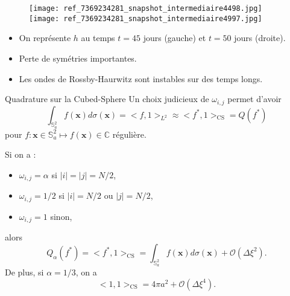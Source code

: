 \documentclass[11pt]{beamer}
\def\CS{\text{CS}}
\def\gint{\displaystyle\int}
\begin{document}
\begin{frame}{}
\begin{figure}
\texttt{[image: ref\_7369234281\_snapshot\_intermediaire4498.jpg]}
\texttt{[image: ref\_7369234281\_snapshot\_intermediaire4997.jpg]}
\end{figure}
\begin{itemize}
\item On représente $h$ au temps $t=45$ jours (gauche) et $t=50$ jours (droite).
\item Perte de symétries importantes.
\item Les ondes de Rossby-Haurwitz sont instables sur des temps longs.
\end{itemize}
\end{frame}






















\begin{frame}{Quadrature sur la Cubed-Sphere}
Un choix judicieux de $\omega_{i,j}$ permet d'avoir
$$
\gint_{\mathbb{S}_a^2} f(\mathbf{x}) d \sigma(\mathbf{x}) = <f, 1>_{L^2} \approx <f^*, \mathfrak{1}>_{\CS} = Q(f^*)
$$
pour $f : \mathbf{x} \in \mathbb{S}_a^2 \mapsto f(\mathbf{x}) \in \mathbb{C}$ régulière. 

\begin{block}{}
Si on a :
\begin{itemize}
\item $\omega_{i,j} = \alpha$ si $|i| = |j| = N/2$,
\item $\omega_{i,j} = 1/2$ si $|i| = N/2$ ou $|j| = N/2$,
\item $\omega_{i,j} = 1$ sinon,
\end{itemize}
alors
$$
 Q_{\alpha}(f^*) =  <f^*, \mathfrak{1}>_{\CS} = \gint_{\mathbb{S}_a^2} f(\mathbf{x}) d \sigma(\mathbf{x}) + \mathcal{O} \left( \Delta \xi^2 \right).
$$
De plus, si $\alpha = 1/3$, on a
$$
<\mathfrak{1}, \mathfrak{1}>_{\CS} = 4 \pi a^2 + \mathcal{O} \left( \Delta \xi^4 \right).
$$ 
\end{block}
\end{frame}
\end{document}
